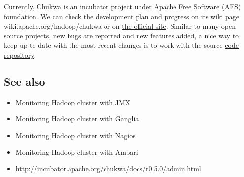 Currently, Chukwa is an incubator project under Apache Free Software (AFS) foundation. We can check the development plan and progress on its wiki page wiki.apache.org/hadoop/chukwa or on \href{http://incubator.apache.org/chukwa/}{the official site}. Similar to many open source projects, new bugs are reported and new features added, a nice way to keep up to date with the most recent changes is to work with the source \href{https://github.com/apache/chukwa}{code repository}.
\subsection*{See also}
\begin{itemize}
  \item Monitoring Hadoop cluster with JMX
  \item Monitoring Hadoop cluster with Ganglia
  \item Monitoring Hadoop cluster with Nagios
  \item Monitoring Hadoop cluster with Ambari
  \item \url{http://incubator.apache.org/chukwa/docs/r0.5.0/admin.html}
\end{itemize}
